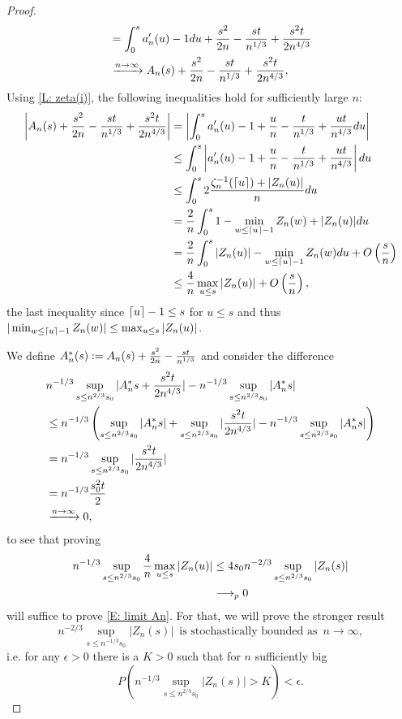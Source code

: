 \begin{proof}
\begin{align*}
	&= \int_{0}^{s} a'_n(u) - 1 du + \frac{s^2}{2n} - \frac{st}{n^{1 / 3}} + \frac{s^2t}{2n^{4 / 3}} \\
	&\xrightarrow{n \rightarrow \infty} A_n(s) + \frac{s^2}{2n} - \frac{st}{n^{1 / 3}} + \frac{s^2t}{2n^{4 / 3}},
	\end{align*}
	Using \ref{L: zeta(i)}, the following inequalities hold for sufficiently large $n$:
    \begin{align*}
    \left| A_n(s) + \frac{s^2}{2n} - \frac{st}{n^{1 / 3}}  + \frac{s^2t}{2n^{4 / 3}}  \right| 
    &= \left| \int_{0}^{s} a'_n(u) - 1 + \frac{u}{n} - \frac{t}{n^{1 / 3}} + \frac{ut}{n^{4 / 3}} du \right| \\
    &\leq \int_{0}^{s} \left|a'_n(u) - 1 + \frac{u}{n} - \frac{t}{n^{1 / 3}} + \frac{ut}{n^{4 / 3}} \right| du \\
    &\leq \int_{0}^{s} 2 \frac{\zeta^{-1}_n(\lceil u\rceil) + |Z_n(u)|}{n} du \\
    &= \frac{2}{n}  \int_{0}^{s} 1-\min_{w \leq \lceil u\rceil-1} Z_n(w)  + |Z_n(u)| du \\
    &= \frac{2}{n}  \int_{0}^{s} |Z_n(u)| - \min_{w \leq \lceil u\rceil-1} Z_n(w) du + O\left(\frac{s}{n}\right) \\
    &\leq \frac{4}{n} \max_{u \leq s} |Z_n(u)| + O\left(\frac{s}{n}\right),
    \end{align*}
    the last inequality since $\lceil u\rceil-1 \leq s$ for $u\leq s$ and thus $|\min_{w \leq \lceil u\rceil-1}Z_n(w)| \leq \max_{u \leq s}|Z_n(u)|$.
    
    We define $A^*_n(s) := A_n(s) + \frac{s^2}{2n} - \frac{st}{n^{1 / 3}}$ and consider the difference
    \begin{align*}
    &n^{-1 / 3}\sup_{s \leq n^{2 / 3} s_0 } | A^*_n{s} + \frac{s^2t}{2n^{4 / 3}}  | - n^{-1 / 3}\sup_{s \leq n^{2 / 3} s_0 } | A^*_n{s} | \\
    &\leq n^{-1 / 3} \left( \sup_{s \leq n^{2 / 3} s_0 } | A^*_n{s} | + \sup_{s \leq n^{2 / 3} s_0 } |\frac{s^2t}{2n^{4 / 3}}|  - n^{-1 / 3}\sup_{s \leq n^{2 / 3} s_0 } | A^*_n{s} | \right) \\
    &= n^{-1 / 3} \sup_{s \leq n^{2 / 3} s_0 } |\frac{s^2t}{2n^{4 / 3}}| \\
    &= n^{-1 / 3} \frac{s_0^2t}{2} \\
    &\xrightarrow{n \rightarrow \infty} 0,
    \end{align*}
    to see that proving
    \begin{align*}
    n^{-1 / 3} \sup_{s \leq n^{2 / 3} s_0 } \frac{4}{n} \max_{u \leq s} |Z_n(u)| 
    &\leq 4 s_0 n^{-2 / 3} \sup_{s \leq n^{2 / 3} s_0 } |Z_n(s)| \\
    &\longrightarrow_p 0 
    \end{align*}
    will suffice to prove \ref{E: limit An}.
    For that, we will prove the stronger result 
    \begin{equation}
    n^{-2/3} \sup_{s\leq n^{-1/3} s_0} |Z_n(s)| 
    \enspace \text{is stochastically bounded as} \enspace n \rightarrow \infty ,
    \end{equation} 
    i.e. for any 
    $ \epsilon > 0 $ 
    there is a
    $ K > 0 $
    such that for $n$ sufficiently big 
    \begin{equation} \label{E: stoch bounded}
    P\left( n^{-1/3} \sup_{s\leq n^{2/3} s_0} |Z_n(s)| > K \right) < \epsilon. 
    \end{equation}
    

\end{proof}
